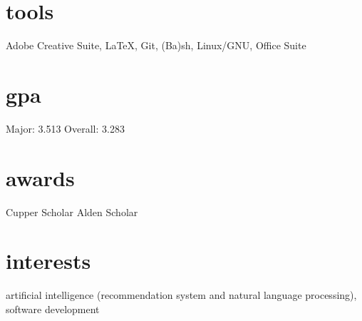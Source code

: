 \documentclass[]{friggeri-cv}
\begin{document}
\begin{aside}
  \section{tools}\vspace{0.05cm}
    Adobe Creative Suite, \LaTeX, Git, (Ba)sh, Linux/GNU, Office Suite
  \section{gpa}\vspace{0.1cm}
  	Major: 3.513
    Overall: 3.283\vspace{0.1cm}
  \section{awards}\vspace{0.05cm}
  Cupper Scholar\vspace{0.1cm}
  Alden Scholar\vspace{0.1cm}
\end{aside}

\section{interests}

artificial intelligence (recommendation system and natural language processing), software development

\end{document}
